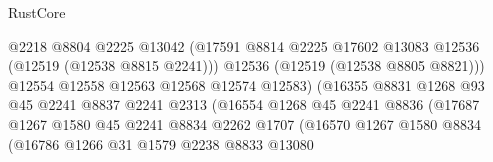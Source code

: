 \begin{lexlean}{RustCore}
\begin{coremodule}
                                          @2218
                                          @8804
                                          @2225
                                          @13042
                                          (@17591
                                            @8814
                                            @2225
                                            @17602
                                            @13083
                                            @12536
                                            (@12519 (@12538 @8815 @2241)))
                                          @12536
                                          (@12519 (@12538 @8805 @8821)))
                                        @12554
                                        @12558
                                        @12563
                                        @12568
                                        @12574
                                        @12583)
                                      (@16355
                                        @8831
                                        @1268
                                        @93
                                        @45
                                        @2241
                                        @8837
                                        @2241
                                        @2313
                                        (@16554
                                          @1268
                                          @45
                                          @2241
                                          @8836
                                          (@17687
                                            @1267
                                            @1580
                                            @45
                                            @2241
                                            @8834
                                            @2262
                                            @1707
                                            (@16570
                                              @1267
                                              @1580
                                              @8834
                                              (@16786
                                                @1266
                                                @31
                                                @1579
                                                @2238
                                                @8833
                                                @13080

\end{coremodule}
\end{lexlean}
